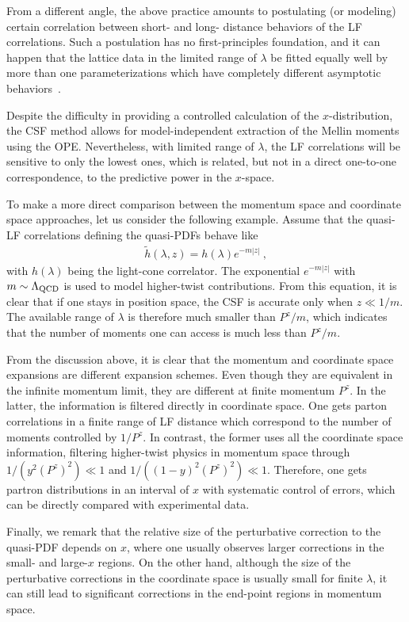 \documentclass[preprint,12pt]{elsarticle}
\begin{document}
From a different angle, the above practice amounts
to postulating (or modeling) certain correlation between short- and long-
distance behaviors of the LF correlations. Such a postulation
has no first-principles foundation, and it can happen that the lattice data in
the limited range of $\lambda$ be fitted equally well by more than one parameterizations which
have completely different asymptotic behaviors~\cite{Sufian:2020vzb}.

Despite the difficulty in providing a controlled calculation of the $x$-distribution, the CSF method allows for model-independent extraction of the Mellin moments using the OPE. Nevertheless, with limited range of $\lambda$, the LF correlations will be sensitive to only the lowest ones, which is related, but not in a direct one-to-one correspondence, to the predictive power in the $x$-space.

To make a more direct comparison between the momentum space and coordinate space approaches, let us consider the following example. Assume that the quasi-LF correlations defining the quasi-PDFs behave like
\begin{align}
\tilde h(\lambda,z)=h(\lambda)e^{-m|z|} \ ,
\end{align}
with $h(\lambda)$ being the light-cone correlator. The exponential $e^{-m|z|}$ with $m\sim \Lambda_{\rm QCD}$ is used to model higher-twist contributions.
From this equation, it is clear that if one stays in position space, the CSF is accurate only when $z\ll 1/m$. The available range of $\lambda$ is therefore much smaller than $P^z/m$, which indicates that the number of moments one can access is much less than $P^z/m$.

From the discussion above, it is clear that the momentum and coordinate space expansions are different expansion schemes. Even though they are equivalent in the infinite momentum limit, they are different at finite
momentum $P^z$.
In the latter, the information is filtered directly
in coordinate space. One gets parton correlations
in a finite range of LF distance which correspond to
the number of moments controlled by $1/P^z$. In contrast, the former uses all the coordinate space information, filtering
higher-twist physics in momentum space through $1/(y^2(P^z)^2)\ll 1$ and $1/((1-y)^2(P^z)^2)\ll 1$.
Therefore, one gets partron distributions in an interval of $x$
with systematic control of errors, which can be directly compared
with experimental data.

Finally, we remark that the relative size of the perturbative correction to the quasi-PDF depends on $x$, where one usually observes larger corrections in the small- and large-$x$ regions. On the other hand, although the size of the perturbative corrections in the coordinate space is usually small for finite $\lambda$, it can still lead to significant corrections in the end-point regions in momentum space.
\end{document}

